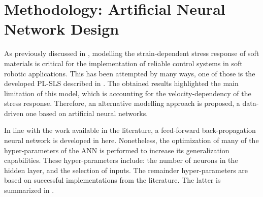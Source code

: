 \section{Methodology: Artificial Neural Network Design}

As previously discussed in , modelling the strain-dependent stress response of soft materials is critical for the implementation of reliable control systems in soft robotic applications. This has been attempted by many ways, one of those is the developed PL-SLS described in . The obtained results highlighted the main limitation of this model, which is accounting for the velocity-dependency of the stress response. Therefore, an alternative modelling approach is proposed, a data-driven one based on artificial neural networks.

In line with the work available in the literature, a feed-forward back-propagation neural network is developed in here. Nonetheless, the optimization of many of the hyper-parameters of the ANN is performed to increase its generalization capabilities. These hyper-parameters include: the number of neurons in the hidden layer, and the selection of inputs. The remainder hyper-parameters are based on successful implementations from the literature. The latter is summarized in .

